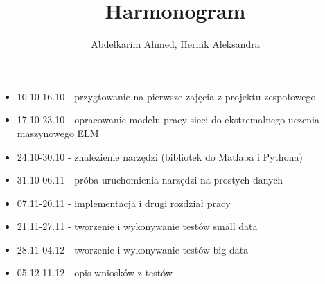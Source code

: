 \documentclass{article}
\title{Harmonogram}
\author{Abdelkarim Ahmed, Hernik Aleksandra}
\begin{document}
\maketitle
\begin{itemize}
\item 10.10-16.10 - przygtowanie na pierwsze zajęcia z projektu zespołowego
\item 17.10-23.10 - opracowanie modelu pracy sieci do ekstremalnego uczenia maszynowego ELM
\item 24.10-30.10 - znalezienie narzędzi (bibliotek do Matlaba i Pythona)
\item 31.10-06.11 - próba uruchomienia narzędzi na prostych danych
\item 07.11-20.11 - implementacja i drugi rozdział pracy
\item 21.11-27.11 - tworzenie i wykonywanie testów small data
\item 28.11-04.12 - tworzenie i wykonywanie testów big data
\item 05.12-11.12 - opis wniosków z testów
\end{itemize}
\end{document}
